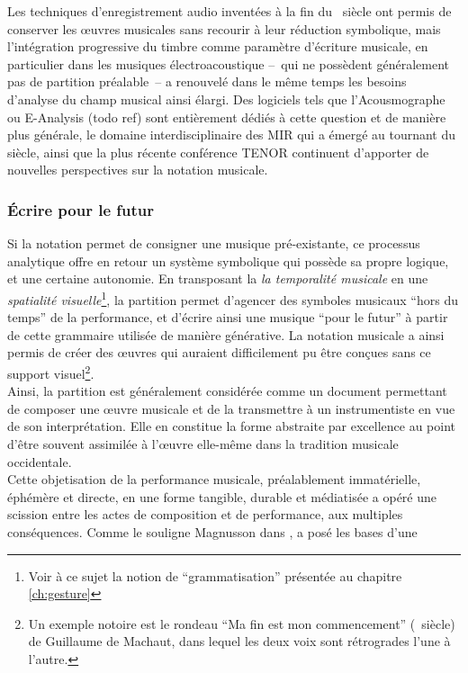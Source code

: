 \indent Les techniques d'enregistrement audio inventées à la fin du ~siècle ont permis de conserver les œuvres musicales sans recourir à leur réduction symbolique, mais l'intégration progressive du timbre comme paramètre d'écriture musicale, en particulier dans les musiques électroacoustique --~qui ne possèdent généralement pas de partition préalable~-- a renouvelé dans le même temps les besoins d'analyse du champ musical ainsi élargi. Des logiciels tels que l'Acousmographe ou E-Analysis (todo ref) sont entièrement dédiés à cette question et de manière plus générale, le domaine interdisciplinaire des \gls{MIR} qui a émergé au tournant du siècle, ainsi que la plus récente conférence \gls{TENOR} continuent d'apporter de nouvelles perspectives sur la notation musicale.

\subsubsection{Écrire pour le futur}

\noindent Si la notation permet de consigner une musique pré-existante, ce processus analytique offre en retour un système symbolique qui possède sa propre logique, et une certaine autonomie. En transposant la \textit{la temporalité musicale} en une \textit{spatialité visuelle}\footnote{Voir à ce sujet la notion de ``grammatisation'' présentée au chapitre \ref{ch:gesture}}, la partition permet d'agencer des symboles musicaux ``hors du temps'' de la performance, et d'écrire ainsi une musique ``pour le futur'' à partir de cette grammaire utilisée de manière générative. La notation musicale a ainsi permis de créer des œuvres qui auraient difficilement pu être conçues sans ce support visuel\footnote{Un exemple notoire est le rondeau ``Ma fin est mon commencement'' (~siècle) de Guillaume de Machaut, dans lequel les deux voix sont rétrogrades l'une à l'autre.}.\\
\indent Ainsi, la partition est généralement considérée comme un document permettant de composer une œuvre musicale et de la transmettre à un instrumentiste en vue de son interprétation. Elle en constitue la forme abstraite par excellence au point d'être souvent assimilée à l'œuvre elle-même dans la tradition musicale occidentale.\\
\indent Cette objetisation de la performance musicale, préalablement immatérielle, éphémère et directe, en une forme tangible, durable et médiatisée a opéré une scission entre les actes de composition et de performance, aux multiples conséquences. Comme le souligne Magnusson dans \cite{magnusson_algorithms_2011},  a posé les bases d'une 

